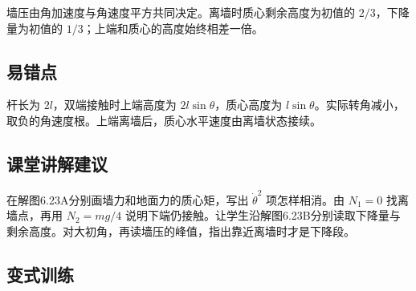 \documentclass[UTF8,fontset=fandol,a4paper,11pt]{ctexart}
\begin{document}
墙压由角加速度与角速度平方共同决定。离墙时质心剩余高度为初值的 $2/3$，下降量为初值的 $1/3$；上端和质心的高度始终相差一倍。



\subsection*{易错点}

杆长为 $2l$，双端接触时上端高度为 $2l\sin\theta$，质心高度为 $l\sin\theta$。实际转角减小，取负的角速度根。上端离墙后，质心水平速度由离墙状态接续。



\subsection*{课堂讲解建议}

在解图6.23A分别画墙力和地面力的质心矩，写出 $\dot\theta^2$ 项怎样相消。由 $N_1=0$ 找离墙点，再用 $N_2=mg/4$ 说明下端仍接触。让学生沿解图6.23B分别读取下降量与剩余高度。对大初角，再读墙压的峰值，指出靠近离墙时才是下降段。




\subsection*{变式训练}
\end{document}

